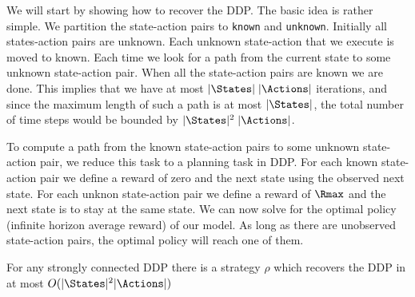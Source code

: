 We will start by showing how to recover the DDP. The basic idea is
rather simple. We partition the state-action pairs to {\tt known}
and {\tt unknown}. Initially all states-action pairs are unknown.
Each unknown state-action that we execute is moved to known. Each
time we look for a path from the current state to some unknown
state-action pair. When all the state-action pairs are known we are
done. This implies that we have at most $|\States|\;|\Actions|$
iterations, and since the maximum length of such a path is at most
$|\States|$, the total number of time steps would be bounded by
$|\States|^2\;|\Actions|$.

To compute a path from the known state-action pairs to some unknown
state-action pair, we reduce this task to a planning task in DDP.
%
For each known state-action pair  we define a reward of zero and the
next state using the observed next state. For each unknon
state-action pair we define a reward of $\Rmax$ and the next state
is to stay at the same state. We can now solve for the optimal
policy (infinite horizon average reward) of our model. As long as
there are unobserved state-action pairs, the optimal policy will
reach one of them.

\begin{theorem}
For any strongly connected DDP there is a strategy $\rho$ which
recovers the DDP in at most $O(|\States|^2 |\Actions|)$
\end{theorem}

